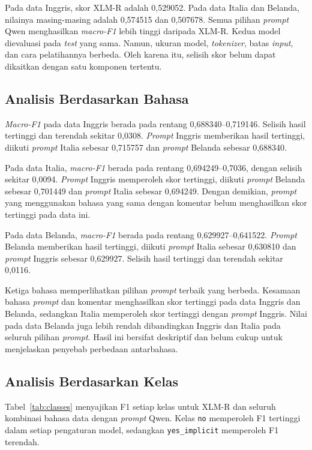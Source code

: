 \documentclass[11pt]{article}
\begin{document}
Pada data Inggris, skor XLM-R adalah 0,529052. Pada data Italia dan Belanda, nilainya masing-masing adalah 0,574515 dan 0,507678. Semua pilihan \textit{prompt} Qwen menghasilkan \textit{macro-F1} lebih tinggi daripada XLM-R. Kedua model dievaluasi pada \textit{test} yang sama. Namun, ukuran model, \textit{tokenizer}, batas \textit{input}, dan cara pelatihannya berbeda. Oleh karena itu, selisih skor belum dapat dikaitkan dengan satu komponen tertentu.

\subsection{Analisis Berdasarkan Bahasa}
\textit{Macro-F1} pada data Inggris berada pada rentang 0,688340--0,719146. Selisih hasil tertinggi dan terendah sekitar 0,0308. \textit{Prompt} Inggris memberikan hasil tertinggi, diikuti \textit{prompt} Italia sebesar 0,715757 dan \textit{prompt} Belanda sebesar 0,688340.

Pada data Italia, \textit{macro-F1} berada pada rentang 0,694249--0,7036, dengan selisih sekitar 0,0094. \textit{Prompt} Inggris memperoleh skor tertinggi, diikuti \textit{prompt} Belanda sebesar 0,701449 dan \textit{prompt} Italia sebesar 0,694249. Dengan demikian, \textit{prompt} yang menggunakan bahasa yang sama dengan komentar belum menghasilkan skor tertinggi pada data ini.

Pada data Belanda, \textit{macro-F1} berada pada rentang 0,629927--0,641522. \textit{Prompt} Belanda memberikan hasil tertinggi, diikuti \textit{prompt} Italia sebesar 0,630810 dan \textit{prompt} Inggris sebesar 0,629927. Selisih hasil tertinggi dan terendah sekitar 0,0116.

Ketiga bahasa memperlihatkan pilihan \textit{prompt} terbaik yang berbeda. Kesamaan bahasa \textit{prompt} dan komentar menghasilkan skor tertinggi pada data Inggris dan Belanda, sedangkan Italia memperoleh skor tertinggi dengan \textit{prompt} Inggris. Nilai pada data Belanda juga lebih rendah dibandingkan Inggris dan Italia pada seluruh pilihan \textit{prompt}. Hasil ini bersifat deskriptif dan belum cukup untuk menjelaskan penyebab perbedaan antarbahasa.

\subsection{Analisis Berdasarkan Kelas}
Tabel~\ref{tab:classes} menyajikan F1 setiap kelas untuk XLM-R dan seluruh kombinasi bahasa data dengan \textit{prompt} Qwen. Kelas \texttt{no} memperoleh F1 tertinggi dalam setiap pengaturan model, sedangkan \texttt{yes\_implicit} memperoleh F1 terendah.
\end{document}

